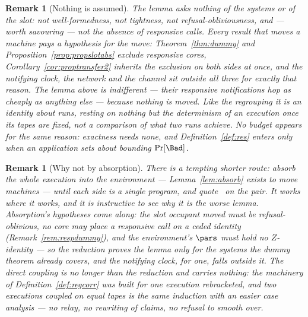 \documentclass[10pt,oneside,openany]{book}
\theoremstyle{accentdef}
\newtheorem{remark}[definition]{Remark}
\theoremstyle{accentplain}
\begin{document}
\begin{remark}[Nothing is assumed]\label{rem:iubfree}
The lemma asks nothing of the systems or of the slot: not well-formedness, not tightness, not
refusal-obliviousness, and --- worth savouring --- not the absence of responsive calls. Every
result that moves a machine pays a hypothesis for the move: Theorem~\ref{thm:dummy} and
Proposition~\ref{prop:propslotabs} exclude responsive cores, Corollary~\ref{cor:proptransfer2}
inherits the exclusion on both sides at once, and the notifying clock, the network and the
channel sit outside all three for exactly that reason. The lemma above is indifferent --- their
responsive notifications hop as cheaply as anything else --- because nothing is moved. Like the
regrouping it is an identity about runs, resting on nothing but the determinism of an execution
once its tapes are fixed, not a comparison of what two runs achieve. No budget appears for the
same reason: exactness needs none, and Definition~\ref{def:res} enters only when an application
sets about bounding $\Pr[\Bad]$.
\end{remark}

\begin{remark}[Why not by absorption]\label{rem:iubabs}
There is a tempting shorter route: absorb the whole execution into the environment ---
Lemma~\ref{lem:absorb} exists to move machines --- until each side is a single program, and
quote~\cite{BR06} on the pair. It works where it works, and it is instructive to see why it is
the worse lemma. Absorption's hypotheses come along: the slot occupant moved must be
refusal-oblivious, no core may place a responsive call on a ceded identity
(Remark~\ref{rem:respdummy}), and the environment's $\pars$ must hold no $Z$-identity --- so the
reduction proves the lemma only for the systems the dummy theorem already covers, and the
notifying clock, for one, falls outside it. The direct coupling is no longer than the reduction
and carries nothing: the machinery of Definition~\ref{def:regcorr} was built for one execution
rebracketed, and two executions coupled on equal tapes is the same induction with an easier case
analysis --- no relay, no rewriting of claims, no refusal to smooth over.
\end{remark}
\end{document}
